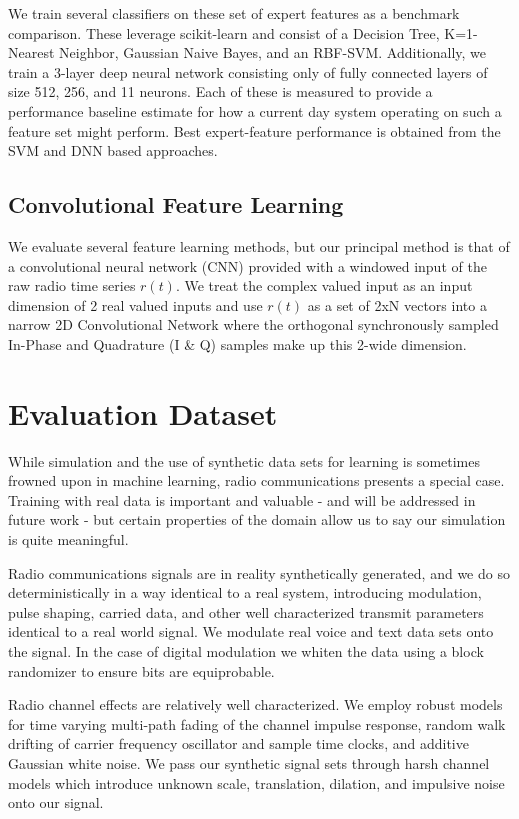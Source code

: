 \documentclass[runningheads,a4paper]{llncs}
\begin{document}
We train several classifiers on these set of expert features as a benchmark comparison.  These leverage scikit-learn and consist of a Decision Tree, K=1-Nearest Neighbor, Gaussian Naive Bayes, and an RBF-SVM.  Additionally, we train a 3-layer deep neural network consisting only of fully connected layers of size 512, 256, and 11 neurons.  Each of these is measured to provide a performance baseline  estimate for how a current day system operating on such a feature set might perform.  Best expert-feature performance is obtained from the SVM and DNN based approaches.

\subsection{Convolutional Feature Learning}

We evaluate several feature learning methods, but our principal method is that of a convolutional neural network (CNN) provided with a windowed input of the raw radio time series $r(t)$.  We treat the complex valued input as an input dimension of 2 real valued inputs and use $r(t)$ as a set of 2xN vectors into a narrow 2D Convolutional Network where the orthogonal synchronously sampled In-Phase and Quadrature (I \& Q) samples make up this 2-wide dimension.

\section{Evaluation Dataset}

While simulation and the use of synthetic data sets for learning is sometimes frowned upon in machine learning, radio communications presents a special case.  Training with real data is important and valuable - and will be addressed in future work - but certain properties of the domain allow us to say our simulation is quite meaningful.

Radio communications signals are in reality synthetically generated, and we do so deterministically in a way identical to a real system, introducing modulation, pulse shaping, carried data, and other well characterized transmit parameters identical to a real world signal.   We modulate real voice and text data sets onto the signal.   In the case of digital modulation we whiten the data using a block randomizer to ensure bits are equiprobable.

Radio channel effects are relatively well characterized. We employ robust models for time varying multi-path fading of the channel impulse response, random walk drifting of carrier frequency oscillator and sample time clocks, and additive Gaussian white noise.  We pass our synthetic signal sets through harsh channel models which introduce unknown scale, translation, dilation, and impulsive noise onto our signal.
\end{document}
